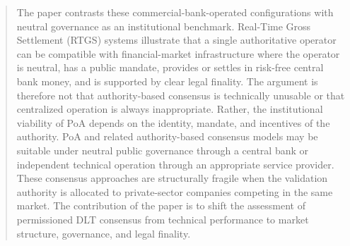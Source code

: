 \documentclass[
reprint,
showkeys,
superscriptaddress,
aps,
pra,
longbibliography,
nofootinbib
]{revtex4-2}
\begin{document}
\begin{abstract}
		The paper contrasts these commercial-bank-operated configurations with neutral governance as an institutional benchmark. Real-Time Gross Settlement (RTGS) systems illustrate that a single authoritative operator can be compatible with financial-market infrastructure where the operator is neutral, has a public mandate, provides or settles in risk-free central bank money, and is supported by clear legal finality. The argument is therefore not that authority-based consensus is technically unusable or that centralized operation is always inappropriate. Rather, the institutional viability of PoA depends on the identity, mandate, and incentives of the authority. PoA and related authority-based consensus models may be suitable under neutral public governance through a central bank or independent technical operation through an appropriate service provider. These consensus approaches are structurally fragile when the validation authority is allocated to private-sector companies competing in the same market. The contribution of the paper is to shift the assessment of permissioned DLT consensus from technical performance to market structure, governance, and legal finality.
	\end{abstract}
	
	
	\maketitle
	
	\FloatBarrier
	
	
\end{document}
